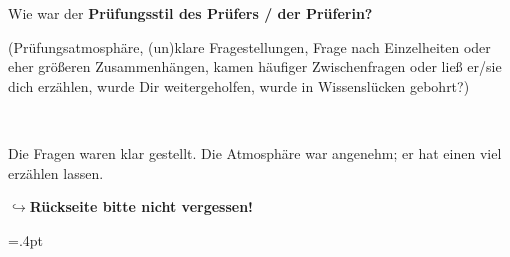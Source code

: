 \documentclass[a4paper]{article}
\begin{document}
 \textbf{} Wie war der \textbf{Prüfungsstil des Prüfers / der Prüferin?} \\
 \begin{footnotesize} (Prüfungsatmosphäre, (un)klare Fragestellungen, Frage nach Einzelheiten oder eher größeren Zusammenhängen, kamen häufiger Zwischenfragen oder ließ er/sie dich erzählen, wurde Dir weitergeholfen, wurde in Wissenslücken gebohrt?)\end{footnotesize}  \\
 \begin{minipage}[t][10cm]{\linewidth}
    Die Fragen waren klar gestellt. Die Atmosphäre war
    angenehm; er hat einen viel erzählen lassen.


 \end{minipage}

 \begin{flushright}$\hookrightarrow$\textbf{Rückseite bitte nicht vergessen!}\end{flushright}

 \newpage
 \columnseprule=.4pt
\end{document}
